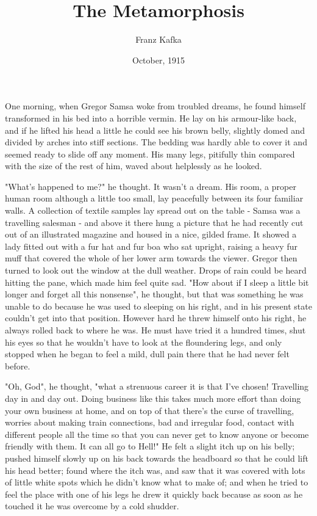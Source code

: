 \documentclass[12pt]{book}
\title{The Metamorphosis}
\author{Franz Kafka}
\date{October, 1915}
\begin{document}
    \maketitle
    \thispagestyle{empty}
    \pagebreak

    \chapter{}
    One morning, when Gregor Samsa woke from troubled dreams, he found himself transformed in his bed into a horrible vermin. He lay on his armour-like back, and if he lifted his head a little he could see his brown belly, slightly domed and divided by arches into stiff sections. The bedding was hardly able to cover it and seemed ready to slide off any moment. His many legs, pitifully thin compared with the size of the rest of him, waved about helplessly as he looked.

    "What's happened to me?" he thought. It wasn't a dream. His room, a proper human room although a little too small, lay peacefully between its four familiar walls. A collection of textile samples lay spread out on the table - Samsa was a travelling salesman - and above it there hung a picture that he had recently cut out of an illustrated magazine and housed in a nice, gilded frame. It showed a lady fitted out with a fur hat and fur boa who sat upright, raising a heavy fur muff that covered the whole of her lower arm towards the viewer. Gregor then turned to look out the window at the dull weather. Drops of rain could be heard hitting the pane, which made him feel quite sad. "How about if I sleep a little bit longer and forget all this nonsense", he thought, but that was something he was unable to do because he was used to sleeping on his right, and in his present state couldn't get into that position. However hard he threw himself onto his right, he always rolled back to where he was. He must have tried it a hundred times, shut his eyes so that he wouldn't have to look at the floundering legs, and only stopped when he began to feel a mild, dull pain there that he had never felt before.

    "Oh, God", he thought, "what a strenuous career it is that I've chosen! Travelling day in and day out. Doing business like this takes much more effort than doing your own business at home, and on top of that there's the curse of travelling, worries about making train connections, bad and irregular food, contact with different people all the time so that you can never get to know anyone or become friendly with them. It can all go to Hell!" He felt a slight itch up on his belly; pushed himself slowly up on his back towards the headboard so that he could lift his head better; found where the itch was, and saw that it was covered with lots of little white spots which he didn't know what to make of; and when he tried to feel the place with one of his legs he drew it quickly back because as soon as he touched it he was overcome by a cold shudder.
\end{document}
